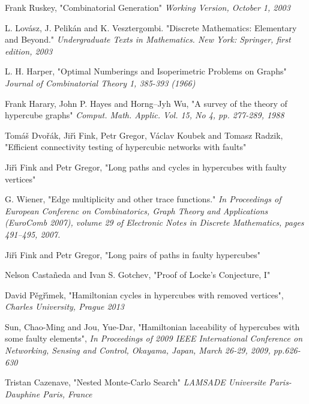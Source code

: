 \documentclass{pracamgr}
\begin{document}
\begin{thebibliography}{99}

   Frank Ruskey,
   "Combinatorial Generation"
   \textit{Working Version, October 1, 2003}

   L. Lov\'{a}sz, J. Pelik\'{a}n and K. Vesztergombi.
   "Discrete Mathematics: Elementary and Beyond."
   \textit{Undergraduate Texts in Mathematics. New York: Springer, first edition, 2003}   

   L. H. Harper,
   "Optimal Numberings and Isoperimetric Problems on Graphs"
   \textit{Journal of Combinatorial Theory 1, 385-393 (1966)}
   
   Frank Harary, John P. Hayes and Horng--Jyh Wu,
   "A survey of the theory of hypercube graphs"
   \textit{Comput. Math. Applic. Vol. 15, No 4, pp. 277-289, 1988}
   
   Tom\'{a}\v{s} Dvo\v{r}\'{a}k, Ji\v{r}\'{\i} Fink, Petr Gregor, V\'{a}clav Koubek and Tomasz Radzik,
   "Efficient connectivity testing of hypercubic networks with faults"
   
   Ji\v{r}\'{\i} Fink and Petr Gregor,
   "Long paths and cycles in hypercubes with faulty vertices"
   
   G. Wiener,
   "Edge multiplicity and other trace functions."
   \textit{In Proceedings of European Conferenc on Combinatorics, Graph Theory and Applications (EuroComb 2007), volume 29 of
   Electronic Notes in Discrete Mathematics, pages 491–495, 2007.}
   
   Ji\v{r}\'{\i} Fink and Petr Gregor,
   "Long pairs of paths in faulty hypercubes"
  
   Nelson Casta\~{n}eda and Ivan S. Gotchev,
   "Proof of Locke's Conjecture, I"

   David P\v{e}g\v{r}\'{\i}mek,
   "Hamiltonian cycles in hypercubes with removed vertices",
   \textit{Charles University, Prague 2013}
  
   Sun, Chao-Ming and Jou, Yue-Dar,
   "Hamiltonian laceability of hypercubes with some faulty elements",
   \textit{In Proceedings of 2009 IEEE International Conference on Networking, Sensing and Control, Okayama, Japan,
   March 26-29, 2009, pp.626-630}
  
   Tristan Cazenave,
   "Nested Monte-Carlo Search"
   \textit{LAMSADE Universite Paris-Dauphine Paris, France}  
  

\end{thebibliography}
\end{document}
